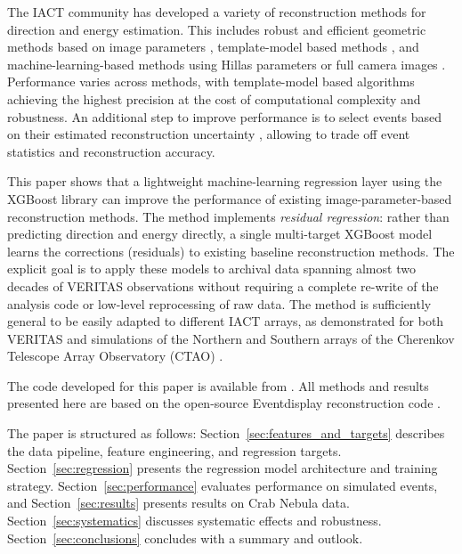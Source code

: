 \documentclass[12pt]{article}
\begin{document}
The IACT community has developed a variety of reconstruction methods for direction and energy estimation.
This includes robust and efficient geometric methods based on image parameters
\citep{1985ICRC....3..445H, 1991ApJ...377L..97A, 1997APh.....8....1D, 1998APh.....8..179C, 1999APh....12..135H},
template-model based methods
\citep{2001A&A...374..895P,2006APh....25..195L, 2009APh....32..231D,2014APh....56...26P, 2024APh...16303008S},
and machine-learning-based methods using
Hillas parameters \citep{2024A&A...691A.328A} or full camera images
\citep{2019ICRC...36..752N}.
Performance varies across methods, with template-model based algorithms achieving
the highest precision at the cost of computational complexity and robustness.
An additional step to improve performance is to select events
based on their estimated reconstruction uncertainty
\citep{2023arXiv230911375B, 2026arXiv260601059Z}, allowing to trade off event
statistics and reconstruction accuracy.

This paper shows that a lightweight machine-learning regression layer
using the XGBoost library \citep{Chen:2016:XST:2939672.2939785}
can improve the performance of existing image-parameter-based
reconstruction methods.
The method implements \textit{residual regression}: rather than predicting direction
and energy directly, a single multi-target XGBoost model learns the corrections
(residuals) to existing baseline reconstruction methods.
The explicit goal is to apply these models to archival data spanning almost two
decades of VERITAS \citep{2006APh....25..391H} observations
without requiring a complete re-write of the analysis code or low-level reprocessing
of raw data.
The method is sufficiently general to be easily adapted to different IACT arrays,
as demonstrated for both VERITAS and simulations of the
Northern and Southern arrays of the Cherenkov Telescope Array Observatory (CTAO)
\citep{2019scta.book.....C}.

The code developed for this paper is available from \citep{maier_2026_18412988}.
All methods and results presented here are based on the open-source Eventdisplay reconstruction
code \citep{maier_2025_17447664,maier_2026_18412887}.

The paper is structured as follows:
Section~\ref{sec:features_and_targets} describes the data pipeline, feature engineering,
and regression targets.
Section~\ref{sec:regression} presents the regression model architecture and training strategy.
Section~\ref{sec:performance} evaluates performance on simulated events,
and Section~\ref{sec:results} presents results on Crab Nebula data.
Section~\ref{sec:systematics} discusses systematic effects and robustness.
Section~\ref{sec:conclusions} concludes with a summary and outlook.
\end{document}

